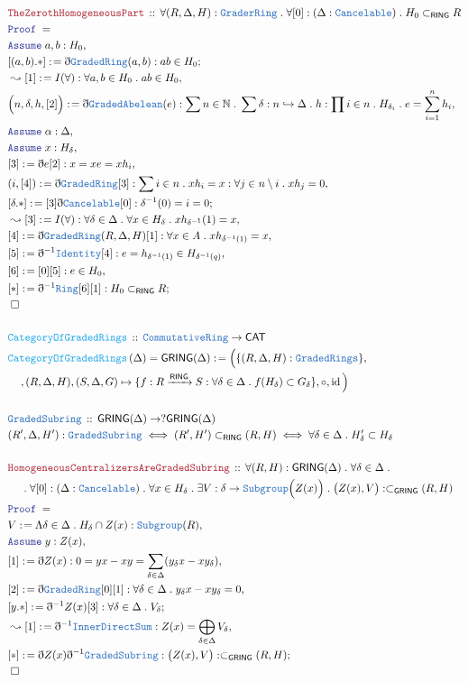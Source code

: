 \documentclass[12pt]{scrartcl}
\newcommand{\TYPE}[1]{\textcolor{NavyBlue}{\mathtt{#1}}}
\newcommand{\FUNC}[1]{\textcolor{Cerulean}{\mathtt{#1}}}
\newcommand{\LOGIC}[1]{\textcolor{Blue}{\mathtt{#1}}}
\newcommand{\THM}[1]{\textcolor{Maroon}{\mathtt{#1}}}
\renewcommand{\.}{\; . \;}
\newcommand{\de}{: \kern 0.1pc =}
\newcommand{\Act}[1]{\left( #1 \right)}
\newcommand{\Theorem}[2]{& \THM{#1} \, :: \, #2 \\ & \Proof = \\ }
\newcommand{\DeclareType}[2]{& \TYPE{#1} \, :: \, #2 \\}
\newcommand{\DefineNamedType}[4]{& #1 : \TYPE{#2} \iff #3 \iff #4 \\}
\newcommand{\DeclareFunc}[2]{& \FUNC{#1} \, :: \, #2 \\}
\newcommand{\DefineNamedFunc}[4]{&  \FUNC{#1}\Act{#2} = #3 \de #4 \\}
\newcommand{\NewLine}{\\ & \kern 1pc}
\newcommand{\Page}[1]{ \begin{align*} #1 \end{align*}   }
\newcommand{ \bd }{ \ByDef }
\newcommand{\Nat}{\mathbb{N} }
\DeclareMathOperator*{\id}{id}
\newcommand{\ToInj}{\hookrightarrow}
\newcommand{\Say}[3]{& #1 \de #2 : #3, \\}
\newcommand{\Conclude}[3]{& #1 \de #2 : #3; \\}
\newcommand{\Derive}[3]{& \leadsto #1 \de #2 : #3, \\}
\newcommand{\Assume}[2]{& \LOGIC{Assume} \; #1 : #2, \\}
\newcommand{\QED}{\; \square}
\newcommand{\EndProof}{& \QED \\}
\newcommand{\ByDef}{\eth}
\newcommand{\Proof}{\LOGIC{Proof} \; }
\newcommand{\Arrow}[1]{\xrightarrow{#1}}
\newcommand{\CAT}{\mathsf{CAT}}
\newcommand{\Ring}{\TYPE{Ring}}
\newcommand{\GA}{\TYPE{GradedAbelean}}
\newcommand{\RING}{\mathsf{RING}}
\newcommand{\GRING}{\mathsf{GRING}}
\begin{document}
\newpage
\Page{
	\Theorem{TheZerothHomogeneousPart}{ \forall (R,\Delta,H) : \TYPE{GraderRing} \. \forall  [0] : (\Delta : \TYPE{Cancelable})    \.  H_0 \subset_{\RING} R }
	\Assume{a,b}{H_0}
	\Conclude{[(a,b).*]}{\bd \TYPE{GradedRing}(a,b)}{ab \in H_0}
	\Derive{[1]}{I(\forall)}{\forall a,b \in H_0 \. ab \in H_0}
	\Say{\Big(n, \delta, h,[2] \Big)}{\bd \GA(e)}{\sum n \in \Nat \. \sum \delta : n \ToInj \Delta \. h : \prod i \in n \. H_{\delta_i} \. e = \sum^n_{i=1} h_i }
	\Assume{\alpha}{\Delta}
	\Assume{x}{H_\delta}
	\Say{[3]}{\bd e [2]}{x = xe = xh_i}
	\Say{(i,[4])}{\bd \TYPE{GradedRing}[3]}{ \sum i \in n \. xh_i = x : \forall j \in n \setminus i \. xh_j = 0}
	\Conclude{[\delta.*]}{[3]\bd \TYPE{Cancelable}[0]}{  \delta^{-1}(0) = i = 0}
	\Derive{[3]}{I(\forall)}{ \forall \delta \in \Delta \. \forall x \in H_\delta \.  xh_{\delta^{-1}}(1) =  x}
	\Say{[4]}{\bd \TYPE{GradedRing}(R,\Delta,H)[1]}{   \forall x \in A \. xh_{\delta^{-1}(1)} = x }
	\Say{[5]}{\bd^{-1} \TYPE{Identity}[4]}{  e = h_{\delta^{-1}(1)}  \in H_{\delta^{-1}(q)}   }
	\Say{[6]}{[0][5]}{e \in H_0}
	\Conclude{[*]}{\bd^{-1} \Ring [6][1] }{ H_0 \subset_{\RING} R  }
	\EndProof
	\\
	\DeclareFunc{CategoryOfGradedRings}{ \TYPE{CommutativeRing} \to \CAT  }
	\DefineNamedFunc{CategoryOfGradedRings}{\Delta}{ \GRING(\Delta) }
	{   
		\Big(  \{ 
			(R,\Delta,H) : \TYPE{GradedRings} \} ,  \NewLine,
			(R,\Delta,H), (S,\Delta,G) \mapsto  \{  f : R \Arrow{\RING} S : \forall \delta \in \Delta \. f(H_\delta) \subset G_\delta \}      
			,\circ,
			\id
		\Big)
	}
	\\
	\DeclareType{GradedSubring}{ \GRING(\Delta) \to ?\GRING(\Delta)  }
	\DefineNamedType{(R',\Delta, H')}{GradedSubring}{ (R',H') \subset_{\RING} (R,H)   }{\forall \delta \in \Delta \. H'_\delta \subset H_\delta}
	\\
	\Theorem{HomogeneousCentralizersAreGradedSubring}{
		\forall (R,H) : \GRING(\Delta) \. 
		\forall \delta \in \Delta \. \NewLine \. 
		\forall [0] : (\Delta : \TYPE{Cancelable}) \.
		\forall x \in H_\delta \.  
		\exists V : \delta \to \TYPE{Subgroup}\Big(Z(x)\Big) \.
		\big(Z(x), V\big) : \subset_{\GRING} (R,H)
	}
	\Say{V}{\Lambda \delta \in \Delta \. H_\delta \cap Z(x)}{\TYPE{Subgroup}(R)}
	\Assume{y}{Z(x)}
	\Say{[1]}{\bd Z(x) }{   0 = yx - xy = \sum_{\delta \in \Delta} (y_\delta x - x y_\delta)   }
	\Say{[2]}{ \bd \TYPE{GradedRing}[0][1] }{ \forall \delta \in \Delta \. y_\delta x - x y_\delta = 0   }
	\Conclude{[y.*]}{\bd^{-1} Z(x)[3]}{ \forall \delta \in \Delta \. V_\delta}
	\Derive{[1] }{ \bd^{-1} \TYPE{InnerDirectSum}}{ Z(x)  = \bigoplus_{\delta \in \Delta} V_\delta }
	\Conclude{[*]}{\bd Z(x) \bd^{-1}\TYPE{GradedSubring}}{ \big(Z(x),V\big) : \subset_{\GRING} (R,H) }
	\EndProof
}
\end{document}
